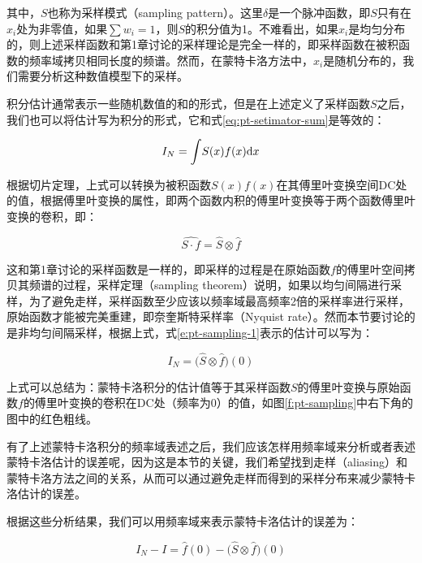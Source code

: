 \noindent 其中，$S$也称为采样模式（sampling pattern）。这里$\delta$是一个脉冲函数，即$S$只有在$x_i$处为非零值，如果$\sum w_i=1$，则$S$的积分值为1。不难看出，如果$x_i$是均匀分布的，则上述采样函数和第1章讨论的采样理论是完全一样的，即采样函数在被积函数的频率域拷贝相同长度的频谱。然而，在蒙特卡洛方法中，$x_i$是随机分布的，我们需要分析这种数值模型下的采样。

积分估计通常表示一些随机数值的和的形式，但是在上述定义了采样函数$S$之后，我们也可以将估计写为积分的形式，它和式\ref{eq:pt-setimator-sum}是等效的：

\begin{equation}\label{e:pt-sampling-1}
	I_N={\rm \int} S(x)f(x){\rm d}x
\end{equation}

根据切片定理，上式可以转换为被积函数$S(x)f(x)$在其傅里叶变换空间DC处的值，根据傅里叶变换的属性，即两个函数内积的傅里叶变换等于两个函数傅里叶变换的卷积，即：

\begin{equation}
	\widehat{S\cdot f}=\hat{S}\otimes\hat{f}
\end{equation}

\noindent 这和第1章讨论的采样函数是一样的，即采样的过程是在原始函数$f$的傅里叶空间拷贝其频谱的过程，采样定理（sampling theorem）说明，如果以均匀间隔进行采样，为了避免走样，采样函数至少应该以频率域最高频率2倍的采样率进行采样，原始函数才能被完美重建，即奈奎斯特采样率（Nyquist rate）。然而本节要讨论的是非均匀间隔采样，根据上式，式\ref{e:pt-sampling-1}表示的估计可以写为：

\begin{equation}
	I_N=\bigg(\hat{S}\otimes\hat{f}\bigg)(0)
\end{equation}

上式可以总结为：蒙特卡洛积分的估计值等于其采样函数$S$的傅里叶变换与原始函数$f$的傅里叶变换的卷积在DC处（频率为0）的值，如图\ref{f:pt-sampling}中右下角的图中的红色粗线。

有了上述蒙特卡洛积分的频率域表述之后，我们应该怎样用频率域来分析或者表述蒙特卡洛估计的误差呢，因为这是本节的关键，我们希望找到走样（aliasing）和蒙特卡洛方法之间的关系，从而可以通过避免走样而得到的采样分布来减少蒙特卡洛估计的误差。

根据这些分析结果，我们可以用频率域来表示蒙特卡洛估计的误差为：

\begin{equation}\label{e:pt-mc-aliasing}
	I_N-I=\hat{f}(0)-\bigg(\hat{S}\otimes\hat{f}\bigg)(0)
\end{equation}


